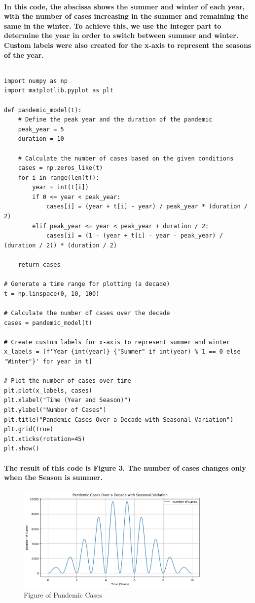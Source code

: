 \paragraph{In this code, the abscissa shows the summer and winter of each year, with the number of cases increasing in the summer and remaining the same in the winter. To achieve this, we use the integer part to determine the year in order to switch between summer and winter. Custom labels were also created for the x-axis to represent the seasons of the year.}
% 
$$  $$
% 
% 
\begin{lstlisting}[style=pystyle]
import numpy as np
import matplotlib.pyplot as plt

def pandemic_model(t):
    # Define the peak year and the duration of the pandemic
    peak_year = 5
    duration = 10

    # Calculate the number of cases based on the given conditions
    cases = np.zeros_like(t)
    for i in range(len(t)):
        year = int(t[i])
        if 0 <= year < peak_year:
            cases[i] = (year + t[i] - year) / peak_year * (duration / 2)
        elif peak_year <= year < peak_year + duration / 2:
            cases[i] = (1 - (year + t[i] - year - peak_year) / (duration / 2)) * (duration / 2)

    return cases

# Generate a time range for plotting (a decade)
t = np.linspace(0, 10, 100)

# Calculate the number of cases over the decade
cases = pandemic_model(t)

# Create custom labels for x-axis to represent summer and winter
x_labels = [f'Year {int(year)} {"Summer" if int(year) % 1 == 0 else "Winter"}' for year in t]

# Plot the number of cases over time
plt.plot(x_labels, cases)
plt.xlabel("Time (Year and Season)")
plt.ylabel("Number of Cases")
plt.title("Pandemic Cases Over a Decade with Seasonal Variation")
plt.grid(True)
plt.xticks(rotation=45)
plt.show()
\end{lstlisting}
% 
% 
% 
% 
% 
% 
% 
% 
% 
% 
% 
\paragraph{The result of this code is \textbf{Figure 3}. The number of cases changes only when the Season is summer.}
% 
% 
% 
% 
% 
% 
% 
% 
% 
% 
% 
\begin{figure}[H]
    \centering
    \includegraphics[width=0.85\textwidth]{pic/Pandemic_cases.png}
    \caption{Figure of Pandemic Cases}
\end{figure}
% 
% 
% 
% 
% 
% 
% 
% 
% 
% 